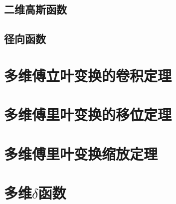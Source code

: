 \subsection{二维高斯函数}
\subsection{径向函数}
\section{多维傅立叶变换的卷积定理}
\section{多维傅里叶变换的移位定理}
\section{多维傅里叶变换缩放定理}
\section{多维$\delta$函数}